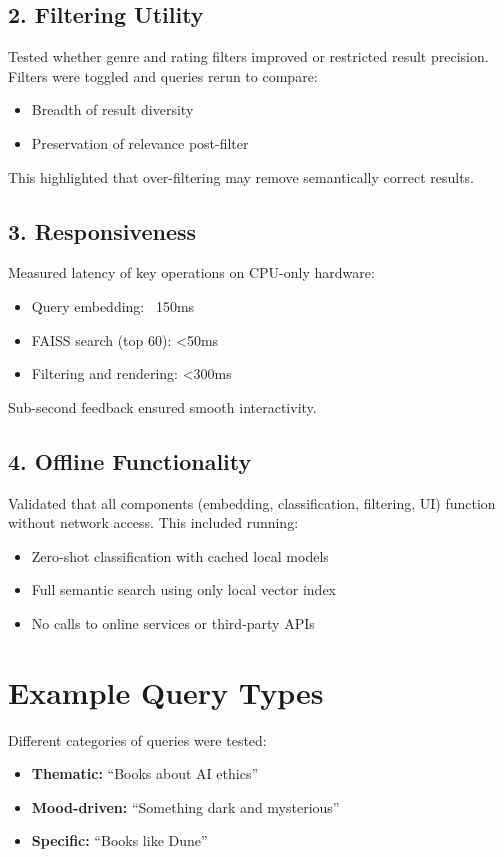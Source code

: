 \subsection*{2. Filtering Utility}
Tested whether genre and rating filters improved or restricted result precision. Filters were toggled and queries rerun to compare:

\begin{itemize}
    \item Breadth of result diversity
    \item Preservation of relevance post-filter
\end{itemize}

This highlighted that over-filtering may remove semantically correct results.

\subsection*{3. Responsiveness}
Measured latency of key operations on CPU-only hardware:

\begin{itemize}
    \item Query embedding: ~150ms
    \item FAISS search (top 60): <50ms
    \item Filtering and rendering: <300ms
\end{itemize}

Sub-second feedback ensured smooth interactivity.

\subsection*{4. Offline Functionality}
Validated that all components (embedding, classification, filtering, UI) function without network access. This included running:

\begin{itemize}
    \item Zero-shot classification with cached local models
    \item Full semantic search using only local vector index
    \item No calls to online services or third-party APIs
\end{itemize}

\section{Example Query Types}
Different categories of queries were tested:
\begin{itemize}
    \item \textbf{Thematic:} “Books about AI ethics”
    \item \textbf{Mood-driven:} “Something dark and mysterious”
    \item \textbf{Specific:} “Books like Dune”
\end{itemize}

